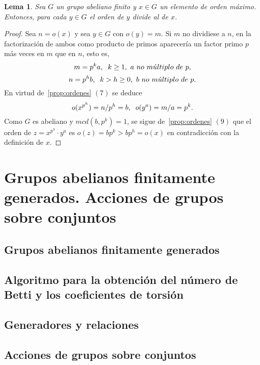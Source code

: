 \documentclass[12pt]{article}
\newtheorem{lemma}{Lema}[theorem]
\begin{document}
\begin{lemma}Sea $G$ un grupo abeliano finito y $x \in G$ un elemento de orden máximo. Entonces, para cada $y \in G$ el orden de $y$ divide al de $x$.
\end{lemma}
\begin{proof}
Sea $n=o(x)$ y sea $y \in G$ con $o(y) = m$. Si $m$ no dividiese a $n$, en la factorización de ambos como producto de primos aparecería un factor primo $p$ más veces en $m$ que en $n$, esto es, $$m = p^ka, \hspace{0.2cm} k \geq 1,~a~no~m\acute{u}ltiplo~de~p,$$ $$n = p^hb, \hspace{0.2cm} k >h \geq 0,~b~no~m\acute{u}ltiplo~de~p.$$ En virtud de~\ref{prop:ordenes} $(7)$ se deduce $$o(x^{p^h}) = n/p^h = b, \hspace{0.2cm} o(y^a) = m/a =p^k.$$ Como $G$ es abeliano y $mcd(b,p^k) = 1$, se sigue de~\ref{prop:ordenes} $(9)$ que el orden de $z = x^{p^h} \cdot y^a$ es $o(z) = bp^k >bp^h = o(x)$ en contradicción con la definición de $x$.

\end{proof}

\section{Grupos abelianos finitamente generados. Acciones de grupos sobre conjuntos}
\subsection{Grupos abelianos finitamente generados}
\subsection{Algoritmo para la obtención del número de Betti y los coeficientes de torsión}
\subsection{Generadores y relaciones}
\subsection{Acciones de grupos sobre conjuntos}
\end{document}
